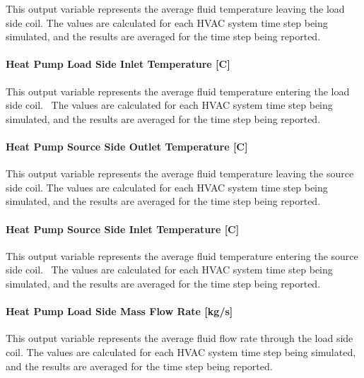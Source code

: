 This output variable represents the average fluid temperature leaving the load side coil. The values are calculated for each HVAC system time step being simulated, and the results are averaged for the time step being reported.

\paragraph{Heat Pump Load Side Inlet Temperature {[}C{]}}\label{water-to-water-heat-pump-load-side-inlet-temperature-c-1}

This output variable represents the average fluid temperature entering the load side coil.~ The values are calculated for each HVAC system time step being simulated, and the results are averaged for the time step being reported.

\paragraph{Heat Pump Source Side Outlet Temperature {[}C{]}}\label{water-to-water-heat-pump-source-side-outlet-temperature-c-1}

This output variable represents the average fluid temperature leaving the source side coil. The values are calculated for each HVAC system time step being simulated, and the results are averaged for the time step being reported.

\paragraph{Heat Pump Source Side Inlet Temperature {[}C{]}}\label{water-to-water-heat-pump-source-side-inlet-temperature-c-1}

This output variable represents the average fluid temperature entering the source side coil.~ The values are calculated for each HVAC system time step being simulated, and the results are averaged for the time step being reported.

\paragraph{Heat Pump Load Side Mass Flow Rate {[}kg/s{]}}\label{water-to-water-heat-pump-load-side-mass-flow-rate-kgs-1}

This output variable represents the average fluid flow rate through the load side coil. The values are calculated for each HVAC system time step being simulated, and the results are averaged for the time step being reported.


